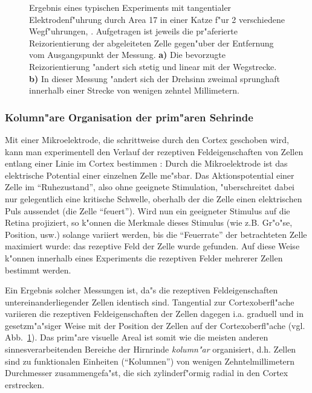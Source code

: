 \begin{figure}[p]
\begin{center}
\begin{minipage}[m]{5.5cm}
\end{minipage}
\hskip1cm
\begin{minipage}[m]{5.5cm}
\end{minipage}
\end{center}
\caption{Ergebnis eines typischen Experiments mit tangentialer
Elektrodenf"uhrung durch Area 17 in einer Katze f"ur 2 verschiedene
Wegf"uhrungen, \protect{}.  Aufgetragen ist
jeweils die pr"aferierte Reizorientierung der abgeleiteten Zelle gegen"uber
der Entfernung vom Ausgangspunkt der Messung.  \textbf{a)} Die bevorzugte
Reizorientierung "andert sich stetig und linear mit der Wegstrecke.
\textbf{b)} In dieser Messung "andert sich der Drehsinn zweimal sprunghaft
innerhalb einer Strecke von wenigen zehntel Millimetern.}
\label{opelektrode}
\end{figure}

\subsubsection{Kolumn"are Organisation der prim"aren Sehrinde}

Mit einer Mikroelektrode, die schrittweise durch den Cortex geschoben wird,
kann man experimentell den Verlauf der rezeptiven Feldeigenschaften von
Zellen entlang einer Linie im Cortex bestimmen
: Durch die  Mikroelektrode ist
das elektrische Potential einer einzelnen Zelle me"sbar.  Das
Aktionspotential einer Zelle im ``Ruhezustand'', also ohne geeignete
Stimulation, "uberschreitet dabei nur gelegentlich eine kritische Schwelle,
oberhalb der die Zelle einen elektrischen Puls aussendet (die Zelle
``feuert'').  Wird nun ein geeigneter Stimulus auf die Retina projiziert,
so k"onnen die Merkmale dieses Stimulus (wie z.B. Gr"o"se, Position, usw.)
solange variiert werden, bis die ``Feuerrate'' der betrachteten Zelle
maximiert wurde: das rezeptive Feld der Zelle wurde gefunden.  Auf diese
Weise k"onnen innerhalb eines Experiments die rezeptiven Felder mehrerer
Zellen bestimmt werden.

Ein Ergebnis solcher Messungen ist, da"s die rezeptiven Feldeigenschaften
untereinanderliegender Zellen identisch sind. Tangential zur
Cortexoberfl"ache variieren die rezeptiven Feldeigenschaften der Zellen
dagegen i.a. graduell und in gesetzm"a"siger Weise mit der Position der
Zellen auf der Cortexoberfl"ache (vgl. Abb.~\ref{opelektrode}).  Das
prim"are visuelle Areal ist somit wie die meisten anderen
sinnesverarbeitenden Bereiche der Hirnrinde \emph{kolumn"ar} organisiert,
d.h.  Zellen sind zu funktionalen Einheiten (``Kolumnen'') von wenigen
Zehntelmillimetern Durchmesser zusammengefa"st, die sich zylinderf"ormig
radial in den Cortex erstrecken.


